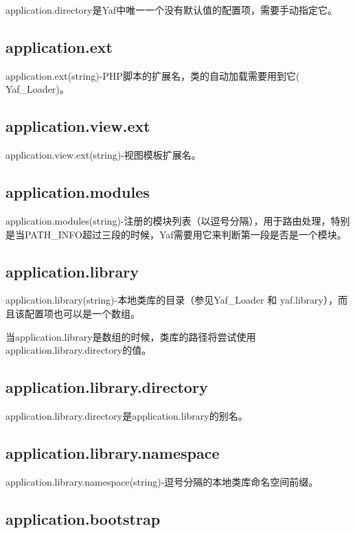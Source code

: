 application.directory是Yaf中唯一一个没有默认值的配置项，需要手动指定它。

\subsection{application.ext}

application.ext(string)-PHP脚本的扩展名，类的自动加载需要用到它( Yaf\_Loader)。

\subsection{application.view.ext}

application.view.ext(string)-视图模板扩展名。

\subsection{application.modules}


application.modules(string)-注册的模块列表（以逗号分隔），用于路由处理，特别是当PATH\_INFO超过三段的时候，Yaf需要用它来判断第一段是否是一个模块。

\subsection{application.library}

application.library(string)-本地类库的目录（参见Yaf\_Loader 和 yaf.library），而且该配置项也可以是一个数组。

当application.library是数组的时候，类库的路径将尝试使用application.library.directory的值。

\subsection{application.library.directory}

application.library.directory是application.library的别名。

\subsection{application.library.namespace}

application.library.namespace(string)-逗号分隔的本地类库命名空间前缀。


\subsection{application.bootstrap}


